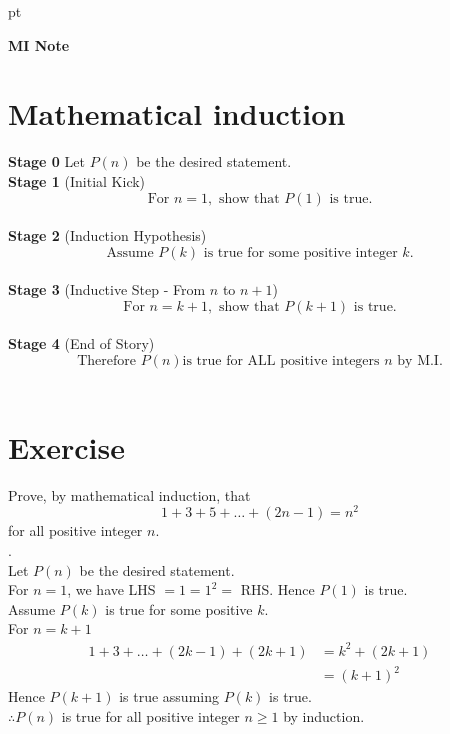 \documentclass[12pt]{article}
\begin{document}
 pt
\begin{center}
	{\large \bf MI Note}\\
	\vspace{2 mm}

\end{center}
\vspace{0.05cm}

\section{\textbf{Mathematical induction}}


\raggedright {\bf Stage 0} Let $P(n)$ be the desired statement.\\
{\bf Stage 1} (Initial Kick)$$\text{For }n = 1, \text{ show that }P(1) \text{ is true.}$$\\
{\bf Stage 2} (Induction Hypothesis)$$\text{Assume }P(k)\text{ is true for some positive integer }k.$$\\
{\bf Stage 3} (Inductive Step - From $n$ to $n+1$)$$\text{For }n = k+1,\text{ show that }P(k+1)\text{ is true.}$$\\
{\bf Stage 4} (End of Story)$$\text{Therefore }P(n)\text{is true for ALL positive integers }n\text{ by M.I.}$$\\



\section{\textbf{Exercise}}


Prove, by mathematical induction, that $$1+3+5+\ldots+(2n-1)=n^2$$ for all positive integer $n$.\\.\\
Let $P(n)$ be the desired statement.\\
For $n=1$, we have LHS $ = 1 = 1^2 =$ RHS. Hence $P(1)$ is true.\\
Assume $P(k)$ is true for some positive $k$.\\
For $n = k+1$
\begin{align*}
	1 + 3 + \ldots + (2k-1) + (2k+1) &= k^2 + (2k+1)\\
&=(k+1)^2
\end{align*}
Hence $P(k+1)$ is true assuming $P(k)$ is true.\\
$\therefore P(n)$ is true for all positive integer $n\geq 1$ by induction.
\end{document}
